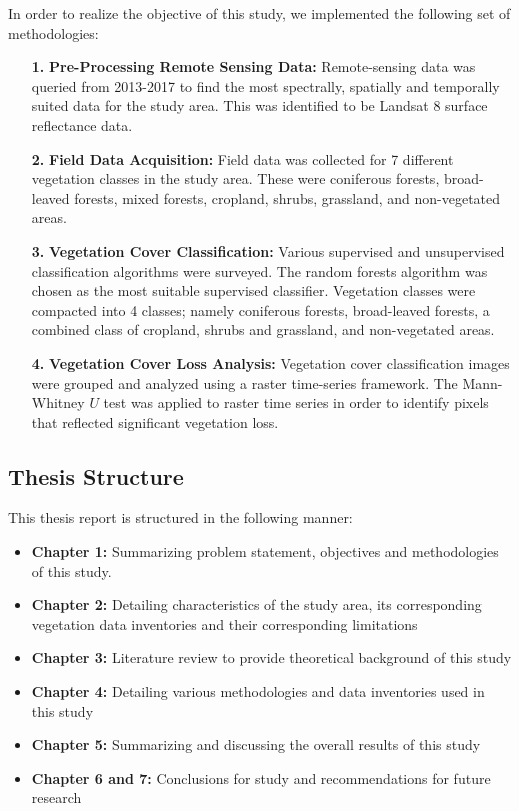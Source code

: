 \justify
In order to realize the objective of this study, we implemented the following set of methodologies:
\begin{itemize}
	\item [\textbf{1.}] \textbf{Pre-Processing Remote Sensing Data:} Remote-sensing data was queried from 2013-2017 to find the most spectrally, spatially and temporally suited data for the study area. This was identified to be Landsat 8 surface reflectance data.
	\item [\textbf{2.}] \textbf{Field Data Acquisition:} Field data was collected for 7 different vegetation classes in the study area. These were coniferous forests, broad-leaved forests, mixed forests, cropland, shrubs, grassland, and non-vegetated areas.
	\item [\textbf{3.}] \textbf{Vegetation Cover Classification:} Various supervised and unsupervised classification algorithms were surveyed. The random forests algorithm was chosen as the most suitable supervised classifier. Vegetation classes were compacted into 4 classes; namely coniferous forests, broad-leaved forests, a combined class of cropland, shrubs and grassland, and non-vegetated areas. 
	\item [\textbf{4.}] \textbf{Vegetation Cover Loss Analysis:} Vegetation cover classification images were grouped and analyzed using a raster time-series framework. The Mann-Whitney $U$ test was applied to raster time series in order to identify pixels that reflected significant vegetation loss.
\end{itemize}

\subsection{Thesis Structure}

\justify
This thesis report is structured in the following manner:

\begin{itemize}
	\item \textbf{Chapter 1:} Summarizing problem statement, objectives and methodologies of this study.
	\item \textbf{Chapter 2:} Detailing characteristics of the study area, its corresponding vegetation data inventories and their corresponding limitations
	\item \textbf{Chapter 3:} Literature review to provide theoretical background of this study
	\item \textbf{Chapter 4:} Detailing various methodologies and data inventories used in this study
	\item \textbf{Chapter 5:} Summarizing and discussing the overall results of this study
	\item \textbf{Chapter 6 and 7:} Conclusions for study and recommendations for future research
\end{itemize}

